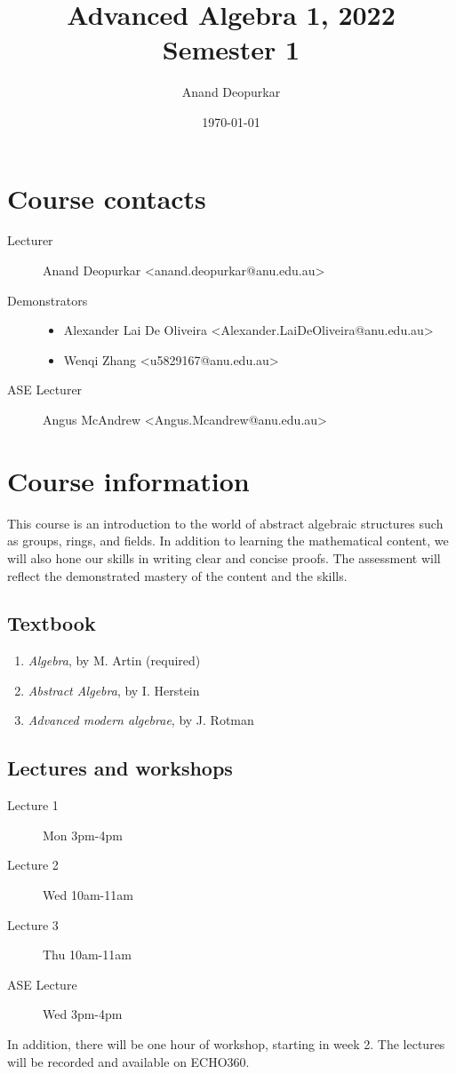 \documentclass[11pt]{article}
\author{Anand Deopurkar}
\date{\today}
\title{Advanced Algebra 1, 2022 Semester 1}
\begin{document}
\maketitle
\section{Course contacts}
\label{sec:org20768b6}
\begin{description}
\item[{Lecturer}] Anand Deopurkar <anand.deopurkar@anu.edu.au>
\item[{Demonstrators}] \begin{itemize}
\item Alexander Lai De Oliveira <Alexander.LaiDeOliveira@anu.edu.au>
\item Wenqi Zhang <u5829167@anu.edu.au>
\end{itemize}
\item[{ASE Lecturer}] Angus McAndrew <Angus.Mcandrew@anu.edu.au>
\end{description}
\section{Course information}
\label{sec:org0a0b8f2}
This course is an introduction to the world of abstract algebraic structures such as groups, rings, and fields.  In addition to learning the mathematical content, we will also hone our skills in writing clear and concise proofs.  The assessment will reflect the demonstrated mastery of the content and the skills.

\subsection{Textbook}
\label{sec:org71a566c}
\begin{enumerate}
\item \emph{Algebra}, by M. Artin (required)
\item \emph{Abstract Algebra}, by I. Herstein
\item \emph{Advanced modern algebrae}, by J. Rotman
\end{enumerate}

\subsection{Lectures and workshops}
\label{sec:orgd72c4b3}
\begin{description}
\item[{Lecture 1}] Mon 3pm-4pm
\item[{Lecture 2}] Wed 10am-11am
\item[{Lecture 3}] Thu 10am-11am
\item[{ASE Lecture}] Wed 3pm-4pm
\end{description}
In addition, there will be one hour of workshop, starting in week 2.
The lectures will be recorded and available on ECHO360.
\end{document}
